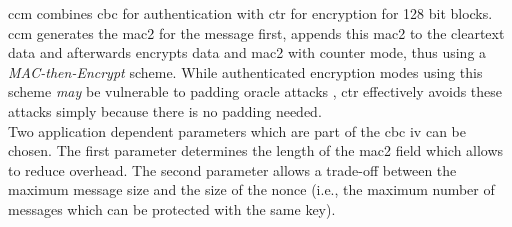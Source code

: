 \gls{ccm} \cite{ccm} combines \gls{cbc} for authentication with \gls{ctr} for encryption for 128 bit blocks.
\gls{ccm} generates the \gls{mac2} for the message first, appends this \gls{mac2} to the cleartext data and afterwards encrypts data and \gls{mac2} with counter mode, thus using a
\textit{MAC-then-Encrypt} scheme. 
While authenticated encryption modes using this scheme \textit{may}
be vulnerable to padding oracle attacks \cite{eurocryptVaudenay02}, \gls{ctr} effectively avoids these attacks simply because
there is no padding needed.
\\
Two application dependent parameters which are part of the \gls{cbc} \gls{iv} can be chosen.
The first parameter determines the length of the \gls{mac2} field which allows to reduce overhead.
The second parameter allows a trade-off between the maximum message size and the size of the nonce (i.e., the maximum number of messages which can be protected with the same key).
% 
% 
% 
% 
% 
% 
% 
